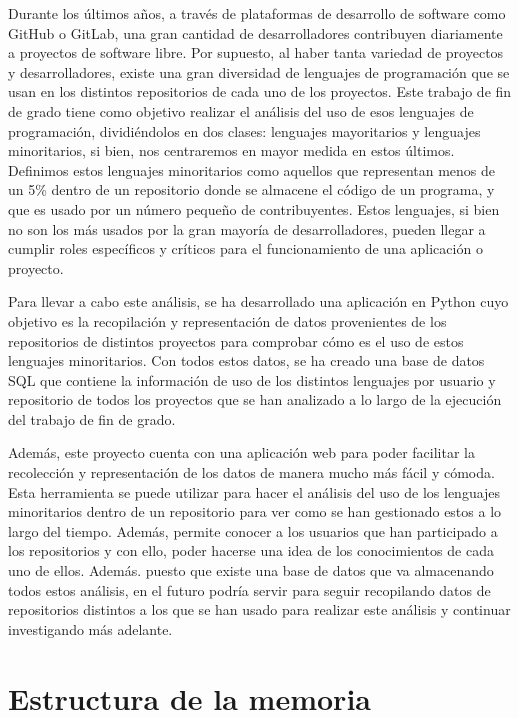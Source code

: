 \documentclass[a4paper, 12pt]{book}
\begin{document}
Durante los últimos años, a través de plataformas de desarrollo de software como GitHub o GitLab, una gran cantidad de desarrolladores contribuyen diariamente a proyectos de software libre. Por supuesto, al haber tanta variedad de proyectos y desarrolladores, existe una gran diversidad de lenguajes de programación que se usan en los distintos repositorios de cada uno de los proyectos. Este trabajo de fin de grado tiene como objetivo realizar el análisis del uso de esos lenguajes de programación, dividiéndolos en dos clases: lenguajes mayoritarios y lenguajes minoritarios, si bien, nos centraremos en mayor medida en estos últimos. Definimos estos lenguajes minoritarios como aquellos que representan menos de un 5\% dentro de un repositorio donde se almacene el código de un programa, y que es usado por un número pequeño de contribuyentes. Estos lenguajes, si bien no son los más usados por la gran mayoría de desarrolladores, pueden llegar a cumplir roles específicos y críticos para el funcionamiento de una aplicación o proyecto.

Para llevar a cabo este análisis, se ha desarrollado una aplicación en Python cuyo objetivo es la recopilación y representación de datos provenientes de los repositorios de distintos proyectos para comprobar cómo es el uso de estos lenguajes minoritarios. Con todos estos datos, se ha creado una base de datos SQL que contiene la información de uso de los distintos lenguajes por usuario y repositorio de todos los proyectos que se han analizado a lo largo de la ejecución del trabajo de fin de grado.

Además, este proyecto cuenta con una aplicación web para poder facilitar la recolección y representación de los datos de manera mucho más fácil y cómoda. Esta herramienta se puede utilizar para hacer el análisis del uso de los lenguajes minoritarios dentro de un repositorio para ver como se han gestionado estos a lo largo del tiempo. Además, permite conocer a los usuarios que han participado a los repositorios y con ello, poder hacerse una idea de los conocimientos de cada uno de ellos. Además. puesto que existe una base de datos que va almacenando todos estos análisis, en el futuro podría servir para seguir recopilando datos de repositorios distintos a los que se han usado para realizar este análisis y continuar investigando más adelante. 

\section{Estructura de la memoria}
\label{sec:estructura}
\end{document}
